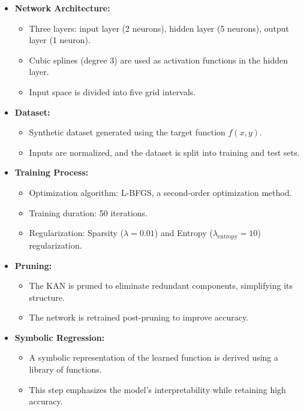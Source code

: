 \begin{itemize}
    \item \textbf{Network Architecture:}
    \begin{itemize}
        \item Three layers: input layer (2 neurons), hidden layer (5 neurons), output layer (1 neuron).
        \item Cubic splines (degree 3) are used as activation functions in the hidden layer.
        \item Input space is divided into five grid intervals.
    \end{itemize}

    \item \textbf{Dataset:}
    \begin{itemize}
        \item Synthetic dataset generated using the target function \( f(x, y) \).
        \item Inputs are normalized, and the dataset is split into training and test sets.
    \end{itemize}

    \item \textbf{Training Process:}
    \begin{itemize}
        \item Optimization algorithm: L-BFGS, a second-order optimization method.
        \item Training duration: 50 iterations.
        \item Regularization: Sparsity (\( \lambda = 0.01 \)) and  Entropy (\( \lambda_{\text{entropy}} = 10 \))  regularization.
        
    \end{itemize}

    \item \textbf{Pruning:}
    \begin{itemize}
        \item The KAN is pruned to eliminate redundant components, simplifying its structure.
        \item The network is retrained post-pruning to improve accuracy.
    \end{itemize}

    \item \textbf{Symbolic Regression:}
    \begin{itemize}
        \item A symbolic representation of the learned function is derived using a library of functions.
        \item This step emphasizes the model's interpretability while retaining high accuracy.
    \end{itemize}
\end{itemize}

